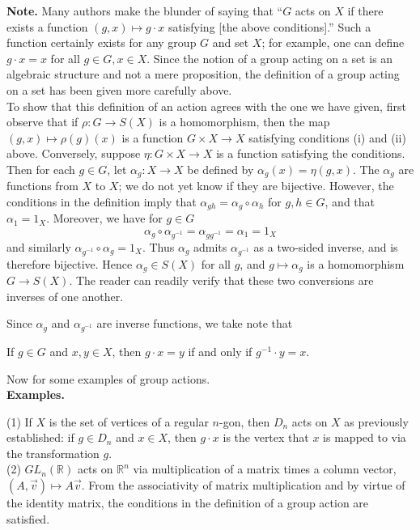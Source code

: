 \documentclass[leqno]{book}
\begin{document}
\noindent\textbf{Note.} Many authors make the blunder of saying that ``$G$ acts on $X$ if there exists a function $(g,x)\mapsto g\cdot x$ satisfying [the above conditions].''  Such a function certainly exists for any group $G$ and set $X$; for example, one can define $g\cdot x=x$ for all $g\in G,x\in X$.  Since the notion of a group acting on a set is an algebraic structure and not a mere proposition, the definition of a group acting on a set has been given more carefully above.\\

\noindent To show that this definition of an action agrees with the one we have given, first observe that if $\rho:G\to S(X)$ is a homomorphism, then the map $(g,x)\mapsto\rho(g)(x)$ is a function $G\times X\to X$ satisfying conditions (i) and (ii) above.  Conversely, suppose $\eta:G\times X\to X$ is a function satisfying the conditions.  Then for each $g\in G$, let $\alpha_g:X\to X$ be defined by $\alpha_g(x)=\eta(g,x)$.  The $\alpha_g$ are functions from $X$ to $X$; we do not yet know if they are bijective.  However, the conditions in the definition imply that $\alpha_{gh}=\alpha_g\circ\alpha_h$ for $g,h\in G$, and that $\alpha_1=1_X$.  Moreover, we have for $g\in G$
$$\alpha_g\circ\alpha_{g^{-1}}=\alpha_{gg^{-1}}=\alpha_1=1_X$$
and similarly $\alpha_{g^{-1}}\circ\alpha_g=1_X$.  Thus $\alpha_g$ admits $\alpha_{g^{-1}}$ as a two-sided inverse, and is therefore bijective.  Hence $\alpha_g\in S(X)$ for all $g$, and $g\mapsto\alpha_g$ is a homomorphism $G\to S(X)$.  The reader can readily verify that these two conversions are inverses of one another.

Since $\alpha_g$ and $\alpha_{g^{-1}}$ are inverse functions, we take note that
\begin{center}
If $g\in G$ and $x,y\in X$, then $g\cdot x=y$ if and only if $g^{-1}\cdot y=x$.
\end{center}
Now for some examples of group actions.\\

\noindent\textbf{Examples.}

(1) If $X$ is the set of vertices of a regular $n$-gon, then $D_n$ acts on $X$ as previously established: if $g\in D_n$ and $x\in X$, then $g\cdot x$ is the vertex that $x$ is mapped to via the transformation $g$.\\

(2) $GL_n(\mathbb R)$ acts on $\mathbb R^n$ via multiplication of a matrix times a column vector, $(A,\vec v)\mapsto A\vec v$.  From the associativity of matrix multiplication and by virtue of the identity matrix, the conditions in the definition of a group action are satisfied.\\
\end{document}
